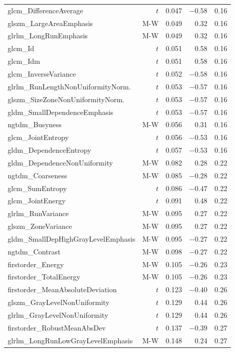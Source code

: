 \begin{appendices}
\begin{longtable}{p{6.5cm}rrrr}
glcm\_DifferenceAverage & $t$ & 0.047 & $-0.58$ & 0.16 \\
glszm\_LargeAreaEmphasis & M-W & 0.049 & 0.32 & 0.16 \\
glrlm\_LongRunEmphasis & M-W & 0.049 & 0.32 & 0.16 \\
glcm\_Id & $t$ & 0.051 & 0.58 & 0.16 \\
glcm\_Idm & $t$ & 0.051 & 0.58 & 0.16 \\
glcm\_InverseVariance & $t$ & 0.052 & $-0.58$ & 0.16 \\
glrlm\_RunLengthNonUniformityNorm. & $t$ & 0.053 & $-0.57$ & 0.16 \\
glszm\_SizeZoneNonUniformityNorm. & $t$ & 0.053 & $-0.57$ & 0.16 \\
gldm\_SmallDependenceEmphasis & $t$ & 0.053 & $-0.57$ & 0.16 \\
ngtdm\_Busyness & M-W & 0.056 & 0.31 & 0.16 \\
glcm\_JointEntropy & $t$ & 0.056 & $-0.53$ & 0.16 \\
gldm\_DependenceEntropy & $t$ & 0.057 & $-0.53$ & 0.16 \\
gldm\_DependenceNonUniformity & M-W & 0.082 & 0.28 & 0.22 \\
ngtdm\_Coarseness & M-W & 0.085 & $-0.28$ & 0.22 \\
glcm\_SumEntropy & $t$ & 0.086 & $-0.47$ & 0.22 \\
glcm\_JointEnergy & $t$ & 0.091 & 0.48 & 0.22 \\
glrlm\_RunVariance & M-W & 0.095 & 0.27 & 0.22 \\
glszm\_ZoneVariance & M-W & 0.095 & 0.27 & 0.22 \\
gldm\_SmallDepHighGrayLevelEmphasis & M-W & 0.095 & $-0.27$ & 0.22 \\
ngtdm\_Contrast & M-W & 0.098 & $-0.27$ & 0.22 \\
firstorder\_Energy & M-W & 0.105 & $-0.26$ & 0.23 \\
firstorder\_TotalEnergy & M-W & 0.105 & $-0.26$ & 0.23 \\
firstorder\_MeanAbsoluteDeviation & $t$ & 0.123 & $-0.40$ & 0.26 \\
glszm\_GrayLevelNonUniformity & $t$ & 0.129 & 0.44 & 0.26 \\
glrlm\_GrayLevelNonUniformity & $t$ & 0.129 & 0.44 & 0.26 \\
firstorder\_RobustMeanAbsDev & $t$ & 0.137 & $-0.39$ & 0.27 \\
glrlm\_LongRunLowGrayLevelEmphasis & M-W & 0.148 & 0.24 & 0.27 \\

\end{longtable}
\end{appendices}
